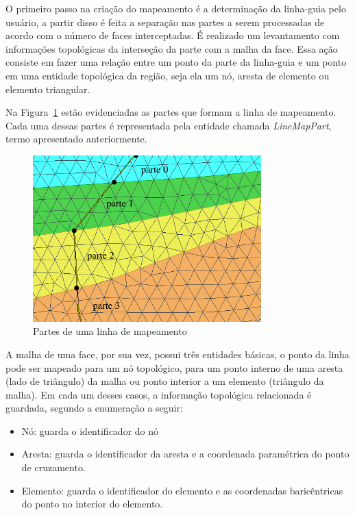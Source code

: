 O primeiro passo na criação do mapeamento é a determinação da linha-guia pelo usuário, a partir disso é feita a separação nas partes a serem processadas de acordo com o número de faces interceptadas. É realizado um levantamento com informações topológicas da interseção da parte com a malha da face. Essa ação consiste em fazer uma relação entre um ponto da parte da linha-guia e um ponto em uma entidade topológica da região, seja ela um nó, aresta de elemento ou elemento triangular.

Na Figura~\ref{fig-linemap-parts} estão evidenciadas as partes que formam a linha de mapeamento. Cada uma dessas partes é representada pela entidade chamada \textit{LineMapPart}, termo apresentado anteriormente.

\begin{figure} [h]
  \begin{center}
    \includegraphics[width=250pt]{images/fig-lm-parts}
    \caption{Partes de uma linha de mapeamento}\label{fig-linemap-parts}
  \end{center}
\end{figure}

A malha de uma face, por sua vez, possui três entidades básicas, o ponto da linha pode ser mapeado para um nó topológico, para um ponto interno de uma aresta (lado de triângulo) da malha ou ponto interior a um elemento (triângulo da malha). Em cada um desses casos, a informação topológica relacionada é guardada, segundo a enumeração a seguir:

\renewcommand{\labelitemi}{•}
\begin{itemize}
  \item Nó: guarda o identificador do nó
  \item Aresta: guarda o identificador da aresta e a coordenada paramétrica do ponto de cruzamento.
  \item Elemento: guarda o identificador do elemento e as coordenadas baricêntricas do ponto no interior do elemento.
\end{itemize}

